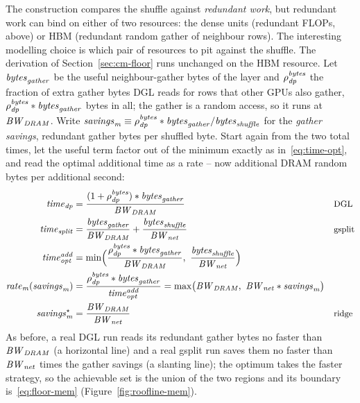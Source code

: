 The construction compares the shuffle against \emph{redundant work}, but redundant work can bind on
either of two resources: the dense units (redundant FLOPs, above) or HBM (redundant random gather of
neighbour rows). The interesting modelling choice is which pair of resources to pit against the
shuffle. The derivation of Section~\ref{sec:cm-floor} runs unchanged on the HBM resource. Let
$\mathit{bytes}_{\mathit{gather}}$ be the useful neighbour-gather bytes of the layer and $\rho^{\mathit{bytes}}_{\mathit{dp}}$ the fraction of extra
gather bytes DGL reads for rows that other GPUs also gather, $\rho^{\mathit{bytes}}_{\mathit{dp}}\ast \mathit{bytes}_{\mathit{gather}}$ bytes in all; the gather is a random access, so it
runs at $\mathit{BW}_{\mathit{DRAM}}$. Write $\mathit{savings}_{\mathit{m}}\equiv\rho^{\mathit{bytes}}_{\mathit{dp}}\ast \mathit{bytes}_{\mathit{gather}}/\mathit{bytes}_{\mathit{shuffle}}$ for the \emph{gather savings}, redundant gather
bytes per shuffled byte. Start again from the two total times, let the useful term factor out of the
minimum exactly as in~\eqref{eq:time-opt}, and read the optimal additional time as a rate -- now
additional DRAM random bytes per additional second:
\begin{align}
  \mathit{time}_{\mathit{dp}} &= \frac{(1+\rho^{\mathit{bytes}}_{\mathit{dp}})\ast \mathit{bytes}_{\mathit{gather}}}{\mathit{BW}_{\mathit{DRAM}}}
  && \text{\small DGL} \notag\\
  \mathit{time}_{\mathit{split}} &= \frac{\mathit{bytes}_{\mathit{gather}}}{\mathit{BW}_{\mathit{DRAM}}} + \frac{\mathit{bytes}_{\mathit{shuffle}}}{\mathit{BW}_{\mathit{net}}}
  && \text{\small gsplit} \notag\\
  \mathit{time}^{\mathit{add}}_{\mathit{opt}} &= \min\!\Big(\frac{\rho^{\mathit{bytes}}_{\mathit{dp}}\ast \mathit{bytes}_{\mathit{gather}}}{\mathit{BW}_{\mathit{DRAM}}},\ \frac{\mathit{bytes}_{\mathit{shuffle}}}{\mathit{BW}_{\mathit{net}}}\Big)
  \notag\\
  \mathit{rate}_{\mathit{m}}(\mathit{savings}_{\mathit{m}}) &= \frac{\rho^{\mathit{bytes}}_{\mathit{dp}}\ast \mathit{bytes}_{\mathit{gather}}}{\mathit{time}^{\mathit{add}}_{\mathit{opt}}}
   = \max\!\big(\mathit{BW}_{\mathit{DRAM}},\ \mathit{BW}_{\mathit{net}}\ast \mathit{savings}_{\mathit{m}}\big)
  \label{eq:floor-mem}\\
  \mathit{savings}_{\mathit{m}}^\star &= \frac{\mathit{BW}_{\mathit{DRAM}}}{\mathit{BW}_{\mathit{net}}}
  && \text{\small ridge}
  \label{eq:ridge-mem}
\end{align}
As before, a real DGL run reads its redundant gather bytes no faster than $\mathit{BW}_{\mathit{DRAM}}$ (a horizontal
line) and a real gsplit run saves them no faster than $\mathit{BW}_{\mathit{net}}$ times the gather savings (a slanting
line); the optimum takes the faster strategy, so the achievable set is the union of the two regions
and its boundary is~\eqref{eq:floor-mem} (Figure~\ref{fig:roofline-mem}).

